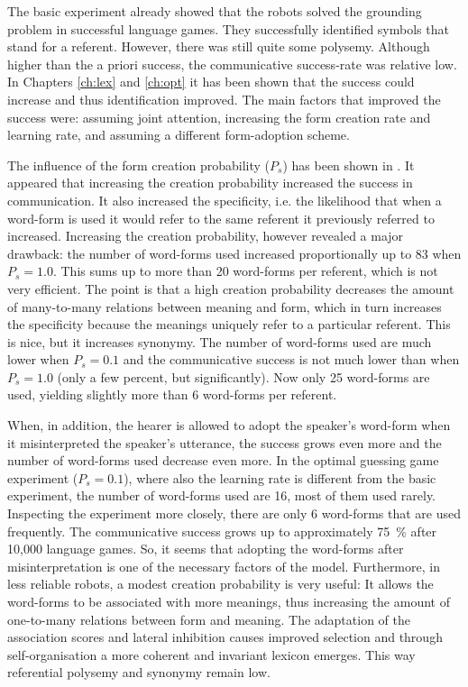 \enlargethispage{1\baselineskip}
The basic experiment already showed that the robots solved the grounding problem in successful language games. They successfully identified symbols that stand for a referent. However, there was still quite some polysemy. Although higher than the a priori success, the communicative success-rate was relative low. In Chapters \ref{ch:lex} and \ref{ch:opt} it has been shown that the success could increase and thus identification improved. The main factors that improved the success were: assuming joint attention, increasing the form creation rate and learning rate, and assuming a different form-adoption scheme.

The influence of the form creation probability ($P_s$) has been shown in . It appeared that increasing the creation probability increased the success in communication. It also increased the specificity, i.e. the likelihood that when a word-form is used it would refer to the same referent it previously referred to increased. Increasing the creation probability, however revealed a major drawback: the number of word-forms used increased proportionally up to 83 when $P_s=1.0$. This sums up to more than 20 word-forms per referent, which is not very efficient. The point is that a high creation probability decreases the amount of many-to-many relations between meaning and form, which in turn increases the specificity because the meanings uniquely refer to a particular referent. This is nice, but it increases synonymy. The number of word-forms used are much lower when $P_s=0.1$ and the communicative success is not much lower than when $P_s=1.0$ (only a few percent, but significantly). Now only 25 word-forms are used, yielding slightly more than 6 word-forms per referent. 

When, in addition, the hearer is allowed to adopt the speaker's word-form when it misinterpreted the speaker's utterance, the success grows even more and the number of word-forms used decrease even more. In the optimal guessing game experiment ($P_s=0.1$), where also the learning rate is different from the basic experiment, the number of word-forms used are 16, most of them used rarely. Inspecting the experiment more closely, there are only 6 word-forms that are used frequently. The communicative success grows up to approximately 75~\% after 10,000 language games. So, it seems that adopting the word-forms after misinterpretation is one of the necessary factors of the model. Furthermore, in less reliable robots, a modest creation probability is very useful: It allows the word-forms to be associated with more meanings, thus increasing the amount of one-to-many relations between form and meaning. The adaptation of the association scores and lateral inhibition causes improved selection and through self-organisation a more coherent and invariant lexicon emerges. This way referential polysemy and synonymy remain low.

